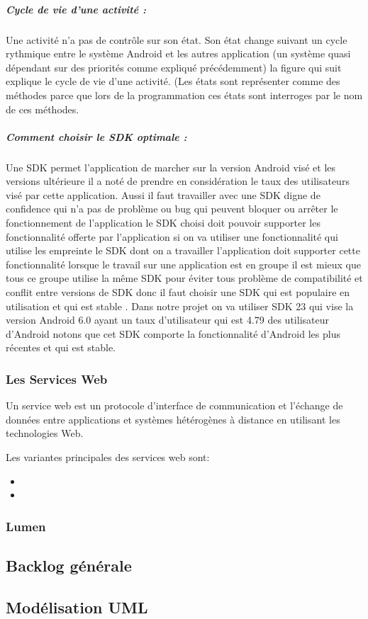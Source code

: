 \subparagraph{Cycle de vie d'une activité :}
Une activité n'a pas de contrôle sur son état.
Son état change suivant un cycle rythmique entre le système Android et les
autres application (un système quasi dépendant sur des priorités comme expliqué
précédemment) la figure qui suit explique le cycle de vie d'une activité. (Les
états sont représenter comme des méthodes parce que lors de la programmation ces
états sont interroges par le nom de ces méthodes.


\subparagraph{Comment choisir le SDK optimale :}
Une SDK permet l'application de marcher sur la version Android visé
et les versions ultérieure il  a noté de prendre en considération le taux des
utilisateurs visé par cette application. Aussi il faut travailler avec une SDK
digne de confidence qui n'a pas de problème ou bug qui peuvent  bloquer ou arrêter
le fonctionnement de l'application le SDK choisi doit pouvoir supporter les
fonctionnalité offerte par l'application si on va utiliser une fonctionnalité
qui utilise les empreinte le SDK dont on a travailler l'application doit supporter
cette fonctionnalité lorsque le travail sur une application est en groupe il est
mieux que tous ce groupe utilise la même SDK pour éviter tous problème de
compatibilité et conflit entre versions de SDK  donc il faut choisir une SDK
qui est populaire en utilisation et qui est stable . Dans notre projet on va
utiliser SDK 23 qui vise la version Android 6.0 ayant un taux d'utilisateur
qui est 4.79 %
des utilisateur d'Android notons que cet SDK comporte
la fonctionnalité d'Android les plus récentes et qui est stable.

\subsubsection{Les Services Web}

Un service web est un protocole d'interface de communication et l'échange de
données entre applications et systèmes hétérogènes à distance en utilisant les
technologies Web.

Les variantes principales des services web sont:
\begin{itemize}
        \item {}
        \item {}
\end{itemize}

\subsubsection{Lumen}

\subsection{Backlog générale}



\subsection{Modélisation UML}
